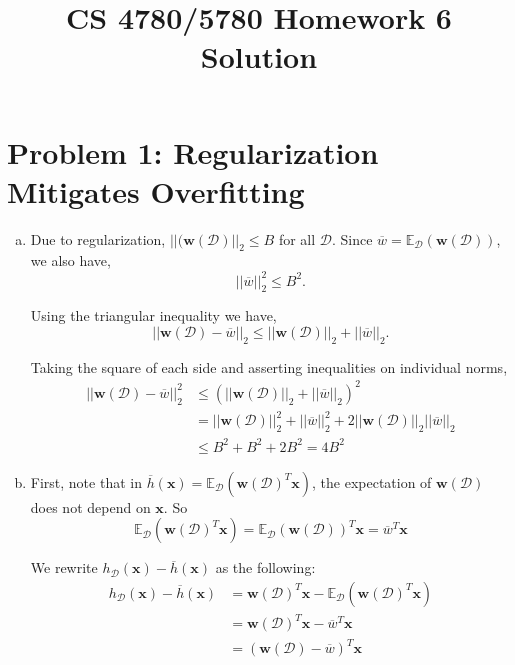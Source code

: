 \documentclass{article}
\title{CS 4780/5780 Homework 6 Solution\vspace{-10pt}}
\author{}
\date{}
\begin{document}
    \maketitle
    \section*{Problem 1: Regularization Mitigates Overfitting}
    \begin{enumerate}[(a)]
        \item
        Due to regularization, $||(\mathbf{w}(\mathcal{D})||_2\leq B$ for all $\mathcal{D}$. Since $\overline{w} = \mathbb{E}_{\mathcal{D}}(\mathbf{w}(\mathcal{D}))$, we also have,
        $$||\overline{w}||_2^2 \leq B^2.$$
        
        Using the triangular inequality we have,
        $$||\mathbf{w}(\mathcal{D}) - \overline{w}||_2 \leq ||\mathbf{w}(\mathcal{D})||_2 + ||\overline{w}||_2.$$
        
        Taking the square of each side and asserting inequalities on individual norms,
        \begin{align*}
            ||\mathbf{w}(\mathcal{D}) - \overline{w}||_2^2 &\leq (||\mathbf{w}(\mathcal{D})||_2 + ||\overline{w}||_2)^2\\
            &= ||\mathbf{w}(\mathcal{D})||_2^2 + ||\overline{w}||_2^2 + 2||\mathbf{w}(\mathcal{D})||_2||\overline{w}||_2\\
            &\leq B^2 + B^2 + 2B^2 = 4B^2
        \end{align*}

        \item First, note that in $\overline{h}(\mathbf{x})=\mathbb{E}_{\mathcal{D}} (\mathbf{w}(\mathcal{D})^T\mathbf{x})$, the expectation of $\mathbf{w}(\mathcal{D})$ does not depend on $\mathbf{x}.$ So
        $$\mathbb{E}_{\mathcal{D}} (\mathbf{w}(\mathcal{D})^T\mathbf{x}) = \mathbb{E}_{\mathcal{D}} (\mathbf{w}(\mathcal{D}))^T\mathbf{x}=\overline{w}^T\mathbf{x}$$
        
        We rewrite $h_\mathcal{D}(\mathbf{x}) - \overline{h}(\mathbf{x})$ as the following:
        \begin{align*}
            h_\mathcal{D}(\mathbf{x}) - \overline{h}(\mathbf{x}) &= \mathbf{w}(\mathcal{D}) ^T \mathbf{x} -\mathbb{E}_{\mathcal{D}} (\mathbf{w}(\mathcal{D})^T\mathbf{x})\\
            &= \mathbf{w}(\mathcal{D}) ^T \mathbf{x} -\overline{w}^T\mathbf{x}\\
            &= (\mathbf{w}(\mathcal{D})-\overline{w})^T\mathbf{x}
        \end{align*}
        

\end{enumerate}
\end{document}
